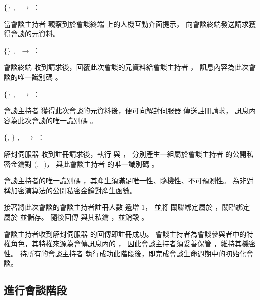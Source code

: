 \begin{pmsgsi}
    \item $\{\}$ $,~$ \DEFowner $\rightarrow$ \DEFmeetingbox：

        當會談主持者 \DEFowner 觀察到於會談終端 \DEFmeetingbox 上的人機互動介面提示，
    向會談終端發送請求獲得會談的元資料。

    \item $\{$\DEFsessionID$\}$ $,~$ \DEFmeetingbox $\rightarrow$ \DEFowner：

        會談終端 \DEFmeetingbox 收到請求後，回覆此次會談的元資料給會談主持者 \DEFowner，
    訊息內容為此次會談的唯一識別碼 \DEFsessionID。

    \item $\{$\DEFsessionID$\}$ $,~$ \DEFowner $\rightarrow$ \DEFserver：

        會談主持者 \DEFowner 獲得此次會談的元資料後，便可向解封伺服器 \DEFserver 傳送註冊請求，
    訊息內容為此次會談的唯一識別碼 \DEFsessionID。

    \item $\{$\DEFownerID, \DEFprivateKey$\}$ $,~$ \DEFserver $\rightarrow$ \DEFowner：

        解封伺服器 \DEFserver 收到註冊請求後，執行 \DEFfuncPKgen{} 與 \DEFfuncIDgen{}，
    分別產生一組屬於會談主持者 \DEFowner 的公開私密金鑰對 $($\DEFpublicKey$,~$ \DEFprivateKey$)$，
    與此會談主持者 \DEFowner 的唯一識別碼 \DEFownerID。

        會談主持者的唯一識別碼 \DEFownerID，其產生須滿足唯一性、隨機性、不可預測性。
    \DEFfuncPKgen{} 為非對稱加密演算法的公開私密金鑰對產生函數。

        接著將此次會談的會談主持者註冊人數 \DEFowreg 遞增 $1$，
    並將 \DEFownerID 關聯綁定屬於 \DEFsessionID，\DEFpublicKey 關聯綁定屬於 \DEFownerID 並儲存。
    隨後回傳 \DEFownerID 與其私鑰 \DEFprivateKey，並銷毀 \DEFprivateKey。

        會談主持者收到解封伺服器 \DEFserver 的回傳即註冊成功。
    會談主持者為會談參與者中的特權角色，其特權來源為會傳訊息內的 \DEFprivateKey，
    因此會談主持者須妥善保管 \DEFprivateKey，維持其機密性。
    待所有的會談主持者 \DEFownerAll 執行成功此階段後，即完成會談生命週期中的初始化會談。
\end{pmsgsi}


\subsection{進行會談階段}\label{subsec:protocol-sessioning}

